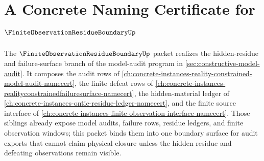 \chapter{A Concrete Naming Certificate for $\FiniteObservationResidueBoundaryUp$}
\label{ch:concrete-instances-finite-observation-residue-boundary-namecert}

The $\FiniteObservationResidueBoundaryUp$ packet realizes the hidden-residue and failure-surface branch of the model-audit program in \autoref{sec:constructive-model-audit}. It composes the audit rows of \autoref{ch:concrete-instances-reality-constrained-model-audit-namecert}, the finite defeat rows of \autoref{ch:concrete-instances-realityconstrainedfailuresurface-namecert}, the hidden-material ledger of \autoref{ch:concrete-instances-ontic-residue-ledger-namecert}, and the finite source interface of \autoref{ch:concrete-instances-finite-observation-interface-namecert}. Those siblings already expose model audits, failure rows, residue ledgers, and finite observation windows; this packet binds them into one boundary surface for audit exports that cannot claim physical closure unless the hidden residue and defeating observations remain visible.

